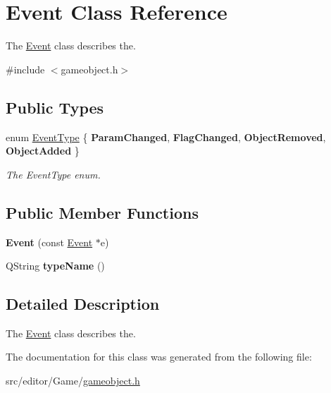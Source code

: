 \hypertarget{class_event}{\section{\-Event \-Class \-Reference}
\label{class_event}
}


\-The \hyperlink{class_event}{\-Event} class describes the.  




{\ttfamily \#include $<$gameobject.\-h$>$}

\subsection*{\-Public \-Types}
\begin{DoxyCompactItemize}
\item 
enum \hyperlink{class_event_aa306292f6e9bf31a622e79dfc54321de}{\-Event\-Type} \{ {\bfseries \-Param\-Changed}, 
{\bfseries \-Flag\-Changed}, 
{\bfseries \-Object\-Removed}, 
{\bfseries \-Object\-Added}
 \}
\begin{DoxyCompactList}\small\item\em \-The \-Event\-Type enum. \end{DoxyCompactList}\end{DoxyCompactItemize}
\subsection*{\-Public \-Member \-Functions}
\begin{DoxyCompactItemize}
\item 
\hypertarget{class_event_af490e691699bb4c74235fc9b224addee}{{\bfseries \-Event} (const \hyperlink{class_event}{\-Event} $\ast$e)}\label{class_event_af490e691699bb4c74235fc9b224addee}

\item 
\hypertarget{class_event_a7770e93e57a92b5d09f9596eae0c9f99}{\-Q\-String {\bfseries type\-Name} ()}\label{class_event_a7770e93e57a92b5d09f9596eae0c9f99}

\end{DoxyCompactItemize}


\subsection{\-Detailed \-Description}
\-The \hyperlink{class_event}{\-Event} class describes the. 

\-The documentation for this class was generated from the following file\-:\begin{DoxyCompactItemize}
\item 
src/editor/\-Game/\hyperlink{gameobject_8h}{gameobject.\-h}\end{DoxyCompactItemize}
